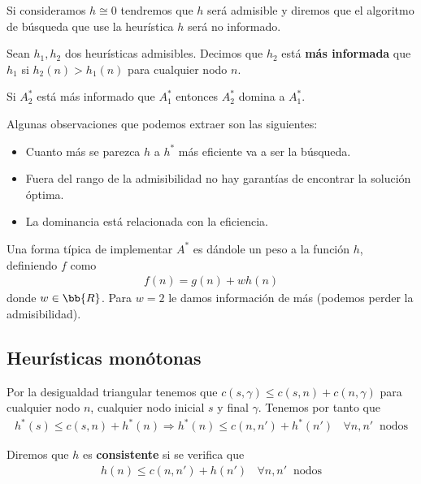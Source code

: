 Si consideramos $h \cong 0$ tendremos que $h$ será admisible y diremos que el algoritmo de búsqueda que use la heurística $h$ será no informado.

\begin{definicion}
    Sean $h_1, h_2$ dos heurísticas admisibles. Decimos que $h_2$ está \textbf{más informada} que $h_1$ si $h_2(n)>h_1(n)$ para cualquier nodo $n$.
\end{definicion}

\begin{teo}
    Si $A_2^*$ está más informado que $A_1^*$ entonces $A_2^*$ domina a $A_1^*$.
\end{teo}

\begin{observacion}
    Algunas observaciones que podemos extraer son las siguientes:
    \begin{itemize}
        \item Cuanto más se parezca $h$ a $h^*$ más eficiente va a ser la búsqueda.
        \item Fuera del rango de la admisibilidad no hay garantías de encontrar la solución óptima.
        \item La dominancia está relacionada con la eficiencia.
    \end{itemize}
\end{observacion}

Una forma típica de implementar $A^*$ es dándole un peso a la función $h$, definiendo $f$ como 
\begin{gather*}
    f(n) = g(n) + wh(n)
\end{gather*}
donde $w\in \bb{R}$. Para $w=2$ le damos información de más (podemos perder la admisibilidad). 


\subsection{Heurísticas monótonas}

Por la desigualdad triangular tenemos que $c(s,\gamma) \leq c(s,n) + c(n, \gamma)$ para cualquier nodo $n$, cualquier nodo inicial $s$ y final $\gamma$. Tenemos por tanto que 
\begin{gather*}
    h^*(s) \leq c(s,n) + h^*(n) \Rightarrow h^*(n) \leq c(n,n') + h^*(n') \ \ \ \ \forall n,n' \ \text{ nodos}
\end{gather*}
\begin{definicion}
    Diremos que $h$ es \textbf{consistente} si se verifica que 
    \begin{gather*}
        h(n) \leq c(n,n') + h(n') \ \ \ \ \forall n,n' \ \text{ nodos}
    \end{gather*}
\end{definicion}

